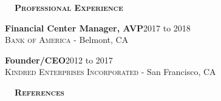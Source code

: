 \documentclass[hidelinks, 10.5pt]{article}
\def\contentwidth{0.9\linewidth}    %
\def\contentspacing{2.5mm}          %
\def\sectionspacing{8mm}            %
\def\sectiontocontentspacing{4mm}   %
\renewcommand{\section}[1]{
    {\fontsize{14}{14}\selectfont \textsc{\textbf{\ \ #1\ \ }}}\hrulefill
}
\begin{document}
{%
\vspace{\sectionspacing}
\section{Professional Experience}

\vspace{\sectiontocontentspacing}

\begin{minipage}[ct]{\contentwidth}
    \textbf{Financial Center Manager, AVP}\hfill 2017 to 2018\\
    {\textsc{Bank of America} - Belmont, CA}
\end{minipage}

\vspace{\contentspacing}

\begin{minipage}[ct]{\contentwidth}
    \textbf{Founder/CEO}\hfill 2012 to 2017\\
    {\textsc{Kindred Enterprises Incorporated} - San Francisco, CA}
\end{minipage}





\vspace{\sectionspacing}


\section{References}

}
\end{document}
